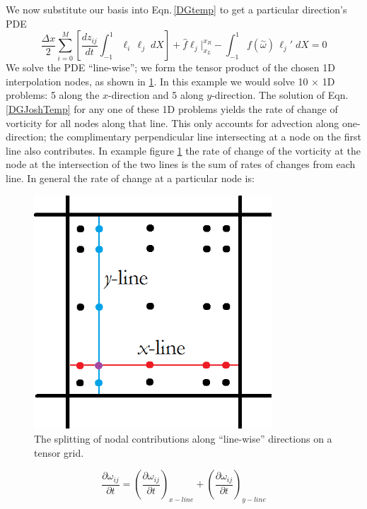 \documentclass[letterpaper,12pt]{report}
\newcommand{\be}{\begin{equation}}
\newcommand{\ben}[1]{\begin{equation}\label{#1}}
\newcommand{\ee}{\end{equation}}
\newcommand{\aomega}{\overset{\sim}{\omega}}				%
\begin{document}
We now substitute our basis into Eqn.\,\eqref{DGtemp} to get a particular direction's PDE
\ben{DGJoshTemp} \frac{\Delta x}{2}	\sum_{i=0}^M \left[ \frac{d z_{ij}}{dt}	\int_{-1}^{1}\ell_i  \, \ell_j \;dX \right]
+\hat{f}\ell_j \Big|^{x_R}_{x_L} 
- \int_{-1}^{1} f(\aomega) \, \ell_j' \;dX = 0 \ee
We solve the PDE ``line-wise''; we form the tensor product of the chosen 1D interpolation nodes, as shown in \ref{fig:DGtensorSplit}. In this example we would solve 10 $\times$ 1D problems: 5 along the $x$-direction and 5 along $y$-direction. The solution of Eqn.\,\eqref{DGJoshTemp} for any one of these 1D problems yields the rate of change of vorticity for all nodes along that line. This only accounts for advection along one-direction; the complimentary perpendicular line intersecting at a node on the first line also contributes. In example figure \ref{fig:DGtensorSplit} the rate of change of the vorticity at the node at the intersection of the two lines is the sum of rates of changes from each line. In general the rate of change at a particular node is:

\begin{figure}
\centering
\includegraphics[width=3.5in]{lineDGelemDiag.PNG}
\caption{\label{fig:DGtensorSplit}The splitting of nodal contributions along ``line-wise'' directions on a tensor grid.}
\end{figure}

\be \frac{\partial \omega_{ij}}{\partial t} = (\frac{\partial \omega_{ij}}{\partial t})_{x-line} + (\frac{\partial \omega_{ij}}{\partial t})_{y-line} \ee

%
\end{document}
